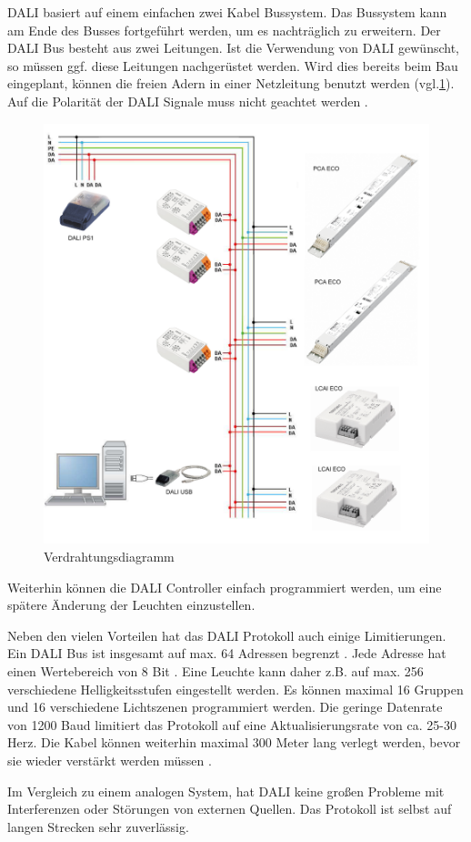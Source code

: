 DALI basiert auf einem einfachen zwei Kabel Bussystem. Das Bussystem kann am Ende des Busses fortgeführt werden, um es nachträglich zu erweitern. Der DALI Bus besteht aus zwei Leitungen. Ist die Verwendung von DALI gewünscht, so müssen ggf. diese Leitungen nachgerüstet werden. Wird dies bereits beim Bau eingeplant, können die freien Adern in einer Netzleitung benutzt werden\cite[p. c.3.2.2]{DALI-Lichtmanagement} (vgl.\ref{fig:wiring diagram}). Auf die Polarität der DALI Signale muss nicht geachtet werden \cite[p.3]{DALI_Handbuch}.

\begin{figure}[H]
	\centering
	\includegraphics[width=.6\linewidth]{Pictures/DaliInstallation}
	\caption{Verdrahtungsdiagramm \cite[p.64]{DALI_Handbuch}}
	\label{fig:wiring diagram}
\end{figure}

Weiterhin können die DALI Controller einfach programmiert werden, um eine spätere Änderung der Leuchten einzustellen.

Neben den vielen Vorteilen hat das DALI Protokoll auch einige Limitierungen. Ein DALI Bus ist insgesamt auf max. 64 Adressen begrenzt \cite[p.7]{DALI_Handbuch}. Jede Adresse hat einen Wertebereich von 8 Bit \cite[p. 1]{DALI-Lichtmanagement}. Eine Leuchte kann daher z.B. auf max. 256 verschiedene Helligkeitsstufen eingestellt werden. Es können maximal 16 Gruppen und 16 verschiedene Lichtszenen programmiert werden. Die geringe Datenrate von 1200 Baud limitiert das Protokoll auf eine Aktualisierungsrate von ca. 25-30 Herz. Die Kabel können weiterhin maximal 300 Meter lang verlegt werden, bevor sie wieder verstärkt werden müssen \cite[p.3]{DALI_Handbuch}. 

Im Vergleich zu einem analogen System, hat DALI keine großen Probleme mit Interferenzen oder Störungen von externen Quellen. Das Protokoll ist selbst auf langen Strecken sehr zuverlässig.

